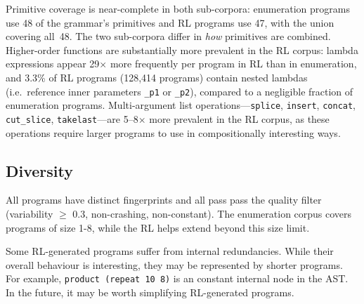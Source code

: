 \documentclass[11pt,a4paper]{article}
\begin{document}
Primitive coverage is near-complete in both sub-corpora: enumeration
programs use 48 of the grammar's primitives and RL programs use 47, with the
union covering all~48.  The two sub-corpora differ in \emph{how} primitives
are combined.  Higher-order functions are substantially more prevalent in the
RL corpus: lambda expressions appear 29$\times$ more frequently per
program in RL than in enumeration, and 3.3\% of RL programs
(128{,}414 programs) contain nested lambdas (i.e.\ reference inner
parameters \texttt{\_p1} or \texttt{\_p2}), compared to a negligible fraction
of enumeration programs.  Multi-argument list operations---\texttt{splice},
\texttt{insert}, \texttt{concat}, \texttt{cut\_slice},
\texttt{takelast}---are 5--8$\times$ more prevalent in the RL corpus, as
these operations require larger programs to use in compositionally
interesting ways.

\subsection{Diversity}\label{sec:diversity}

All programs have distinct fingerprints and all pass pass the quality filter (variability $\geq$ 0.3, non-crashing, non-constant). The enumeration corpus covers programs of size 1-8, while the RL helps extend beyond this size limit.

Some RL-generated programs suffer from internal redundancies. While their overall behaviour is interesting, they may be represented by shorter programs. For example, \texttt{product (repeat 10 8)} is an constant internal node in the AST. In the future, it may be worth simplifying RL-generated programs.



\end{document}
